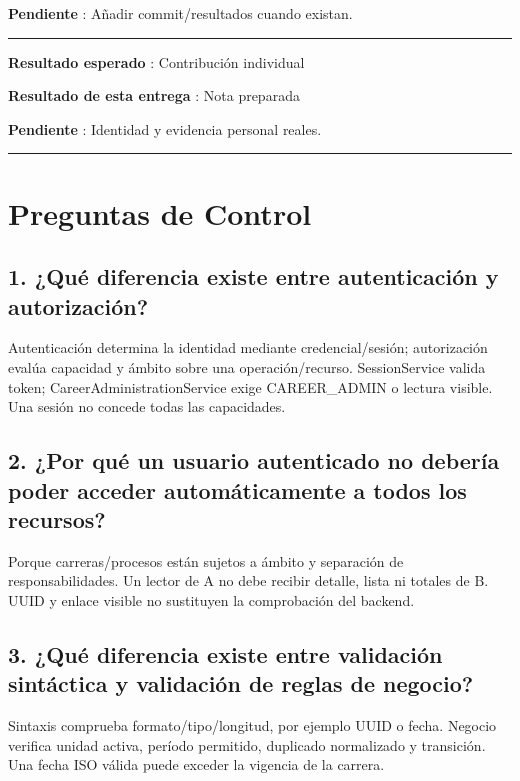 \documentclass[11pt,a4paper]{article}
\begin{document}
\textbf{Pendiente }: Añadir commit/resultados cuando existan.

\medskip\hrule\medskip

\textbf{Resultado esperado }: Contribución individual

\textbf{Resultado de esta entrega }: Nota preparada

\textbf{Pendiente }: Identidad y evidencia personal reales.

\medskip\hrule\medskip

\section{Preguntas de Control}\label{APE4-semana-4-preguntas-de-control}

\subsection{1. ¿Qué diferencia existe entre autenticación y
autorización?}\label{APE4-semana-4-1-quuxe9-diferencia-existe-entre-autenticaciuxf3n-y-autorizaciuxf3n}

Autenticación determina la identidad mediante credencial/sesión;
autorización evalúa capacidad y ámbito sobre una operación/recurso.
SessionService valida token; CareerAdministrationService exige
CAREER\_ADMIN o lectura visible. Una sesión no concede todas las
capacidades.

\subsection{2. ¿Por qué un usuario autenticado no debería poder acceder
automáticamente a todos los
recursos?}\label{APE4-semana-4-2-por-quuxe9-un-usuario-autenticado-no-deberuxeda-poder-acceder-automuxe1ticamente-a-todos-los-recursos}

Porque carreras/procesos están sujetos a ámbito y separación de
responsabilidades. Un lector de A no debe recibir detalle, lista ni
totales de B. UUID y enlace visible no sustituyen la comprobación del
backend.

\subsection{3. ¿Qué diferencia existe entre validación sintáctica y
validación de reglas de
negocio?}\label{APE4-semana-4-3-quuxe9-diferencia-existe-entre-validaciuxf3n-sintuxe1ctica-y-validaciuxf3n-de-reglas-de-negocio}

Sintaxis comprueba formato/tipo/longitud, por ejemplo UUID o fecha.
Negocio verifica unidad activa, período permitido, duplicado normalizado
y transición. Una fecha ISO válida puede exceder la vigencia de la
carrera.
\end{document}
